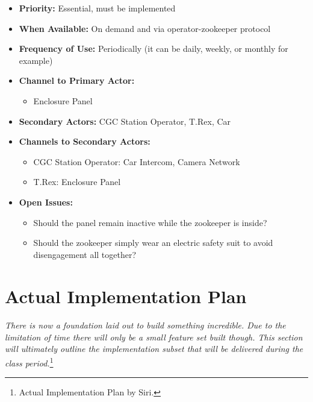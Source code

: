 \documentclass[12pt]{article}
\begin{document}
\begin{itemize}
        \item[]\textbf{Priority:}
            Essential, must be implemented

        \item[]\textbf{When Available:}
            On demand and via operator-zookeeper protocol

        \item[]\textbf{Frequency of Use:}
            Periodically (it can be daily, weekly, or monthly for example)

        \item[]\textbf{Channel to Primary Actor:}
            \begin{itemize}
                \item[] Enclosure Panel
            \end{itemize}

        \item[]\textbf{Secondary Actors:}
            CGC Station Operator, T.Rex, Car
        
        \item[]\textbf{Channels to Secondary Actors:}
            \begin{itemize}
                \item[] CGC Station Operator: Car Intercom, Camera Network
                \item[] T.Rex: Enclosure Panel
            \end{itemize}

        \item[]\textbf{Open Issues:}
            \begin{itemize}
                \item[] Should the panel remain inactive while 
                the zookeeper is inside?
                \item[] Should the zookeeper simply wear an electric 
                safety suit to avoid disengagement all together?
            \end{itemize}
    \end{itemize}
    

\pagebreak
\section{Actual Implementation Plan} \label{impl}
\paragraph{} \textit{There is now a foundation laid out to build something incredible. 
Due to the limitation of time there will only be a small feature set built though. This section will 
ultimately outline the implementation subset that will be delivered during the class period.}\footnote{ Actual Implementation Plan by Siri.}
\end{document}
